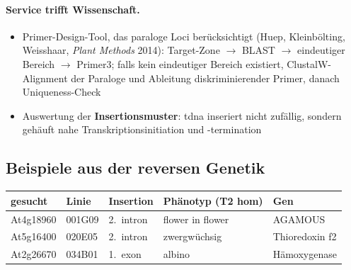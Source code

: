 \paragraph{Service trifft Wissenschaft.}
\begin{itemize}
    \item Primer-Design-Tool, das paraloge Loci berücksichtigt (Huep, Kleinbölting, Weisshaar, \emph{Plant Methods} 2014): Target-Zone $\to$ BLAST $\to$ eindeutiger Bereich $\to$ Primer3; falls kein eindeutiger Bereich existiert, ClustalW-Alignment der Paraloge und Ableitung diskriminierender Primer, danach Uniqueness-Check
    \item Auswertung der \textbf{Insertionsmuster}: \gls{tdna} inseriert nicht zufällig, sondern gehäuft nahe Transkriptionsinitiation und -termination
\end{itemize}


\subsection*{Beispiele aus der reversen Genetik}\label{subsec:beispiele-aus-der-reversen-genetik}
\begin{mytable}
    \begin{tabular}{@{}|l|l|l|l|l|@{}}
        \hline
        \textbf{gesucht} & \textbf{Linie} & \textbf{Insertion} & \textbf{Phänotyp (T2 hom)} & \textbf{Gen} \\
        \hline
        At4g18960 & 001G09 & 2.\ \gls{intron} & flower in flower & AGAMOUS \\
        At5g16400 & 020E05 & 2.\ \gls{intron} & zwergwüchsig & Thioredoxin f2 \\
        At2g26670 & 034B01 & 1.\ \gls{exon} & albino & Hämoxygenase \\
        \hline
    \end{tabular}
\end{mytable}


